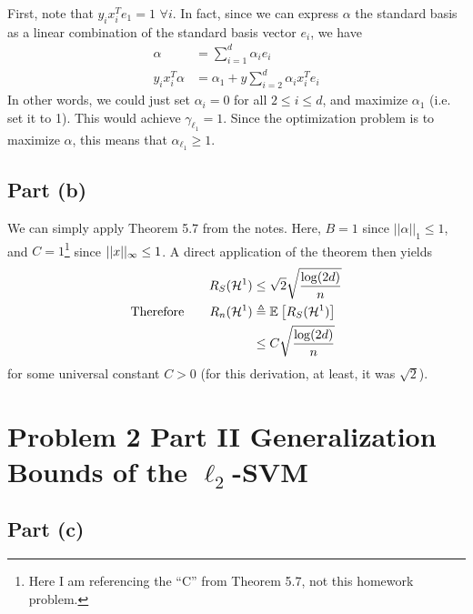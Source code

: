 \documentclass[11pt]{article}
\newcommand{\1}{\mathbb{I}} %
\begin{document}
First, note that $y_i x_i^T e_1 = 1$ $\forall i$. In fact, since we can express $\alpha$ the standard basis as a linear combination of the standard basis vector $e_i$, we have
\begin{align}
	\alpha 
		&= \sum_{i=1}^{d} \alpha_i e_i \\
	y_i x_i^T \alpha 
		&= \alpha_1 + y \sum_{i=2}^{d} \alpha_i x_i^T e_i
\end{align}
In other words, we could just set $\alpha_i = 0$ for all $2 \leq i \leq d$, and maximize $\alpha_1$ (i.e. set it to 1). This would achieve $\gamma_{\ell_1} = 1$. Since the optimization problem is to maximize $\alpha$, this means that $\alpha_{\ell_1} \geq 1$. 



\myspace 
\subsection*{Part (b)}

We can simply apply Theorem 5.7 from the notes. Here, $B = 1$ since $||\alpha||_1 \leq 1$, and $C = 1$\footnote{Here I am referencing the ``C'' from Theorem 5.7, not this homework problem.} since $||x||_{\infty} \leq 1$. A direct application of the theorem then yields 
\begin{align}
	R_S(\mathcal H^1)
		& \leq \sqrt{2} \sqrt{\frac{\log(2d)}{n}} \\
	\text{Therefore}\qquad 
	R_n(\mathcal H^1)
		&\triangleq \mathbb{E}_{}\left[R_S(\mathcal H^1)\right] \\
		&\leq C  \sqrt{\frac{\log(2d)}{n}} 
\end{align}
for some universal constant $C > 0$ (for this derivation, at least, it was $\sqrt{2}$). 







\clearpage
\section*{Problem 2 Part II Generalization Bounds of the $\ell_2$-SVM}


\myspace 
\subsection*{Part (c)}

\end{document}
